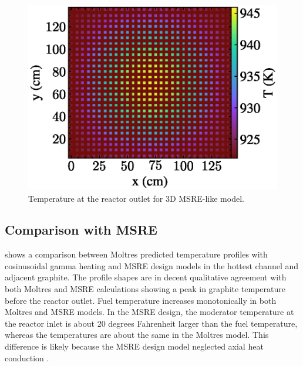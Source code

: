 \documentclass{article}
\let\Oldsubsection\subsection
\renewcommand{\subsection}{\FloatBarrier\Oldsubsection}
\begin{document}
\begin{figure}[htpb]
  \centering
  \includegraphics{3d_gamma_heating_z_slice_temp.eps}
        \caption{Temperature at the reactor outlet for 3D \gls{MSRE}-like
          model.}
  \label{fig:3d_temp_fuel_outlet}
\end{figure}



\subsection{Comparison with \gls{MSRE}}

 shows a comparison between Moltres predicted temperature
profiles with cosinusoidal gamma heating and \gls{MSRE} design models
\cite{briggs_molten-salt_1964} in the hottest channel and adjacent graphite. The
profile shapes are in decent qualitative agreement with both Moltres and
\gls{MSRE} calculations showing a peak in graphite temperature before the
reactor outlet. Fuel temperature increases monotonically in both Moltres and
\gls{MSRE} models. In the \gls{MSRE} design, the moderator
temperature at the reactor inlet is about 20 degrees Fahrenheit larger than the
fuel temperature, whereas the temperatures are about the same in the Moltres
model. This difference is likely because the \gls{MSRE} design model 
neglected axial heat conduction \cite[p. 99]{briggs_molten-salt_1964}.
\end{document}
